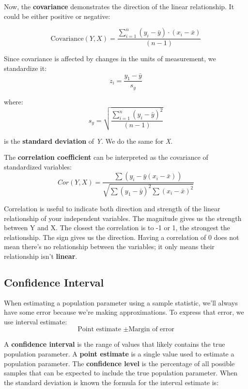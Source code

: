 \documentclass[12pt]{book}
\theoremstyle{definition}
\begin{document}
Now, the \textbf{covariance} demonstrates the direction of the linear relationship. It could be either positive or negative:

\begin{equation}
    \text{Covariance}(Y, X) = \frac{\sum_{i = 1}^{n} (y_i - \bar{y}) \cdot (x_i - \bar{x})}{(n-1)}
\end{equation}

Since covariance is affected by changes in the units of measurement, we standardize it:
\begin{equation}
    z_i = \frac{y_1 - \bar{y}}{s_y}
\end{equation}

where:
\begin{equation}
    s_y = \sqrt{\frac{\sum_{i = 1}^{n} (y_i - \bar{y})^2}{(n-1)}}
\end{equation}

is the \textbf{standard deviation} of \textit{Y}. We do the same for \textit{X}.

The \textbf{correlation coefficient} can be interpreted as the covariance of standardized variables:
\begin{equation}
    Cor(Y, X) = \frac{\sum (y_i - \bar{y} (x_i - \bar{x}))}{\sqrt{\sum (y_1 - \bar{y})^2 \sum (x_i - \bar{x})^2}}
\end{equation}

Correlation is useful to indicate both direction and strength of the linear relationship of your independent variables. The magnitude gives us the strength between Y and X. The closest the correlation is to -1 or 1, the strongest the relationship. The sign gives us the direction.
Having a correlation of 0 does not mean there's no relationship between the variables; it only means their relationship isn't \textbf{linear}.


\subsection{Confidence Interval}
When estimating a population parameter using a sample statistic, we'll always have some error because we're making approximations. To express that error, we use interval estimate:
\begin{equation}
    \text{Point estimate } \pm \text{Margin of error}
\end{equation}

A \textbf{confidence interval} is the range of values that likely contains the true population parameter. A \textbf{point estimate} is a single value used to estimate a population parameter. The \textbf{confidence level} is the percentage of all possible samples that can be expected to include the true population parameter. When the standard deviation is known the formula for the interval estimate is:
\end{document}
